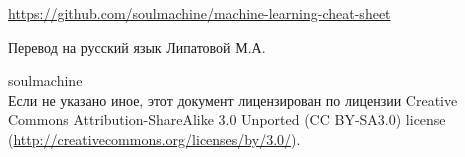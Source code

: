 \onecolumn
\begin{titlepage}

\url{https://github.com/soulmachine/machine-learning-cheat-sheet}

\foreignlanguage{russian}{Перевод на русский язык Липатовой М.А.}

\end{titlepage}

\newpage

\noindent {} soulmachine \\
Если не указано иное, этот документ лицензирован по лицензии Creative Commons 
Attribution-ShareAlike 3.0 Unported (CC BY-SA3.0) license \\ (\url{http://creativecommons.org/licenses/by/3.0/}).
